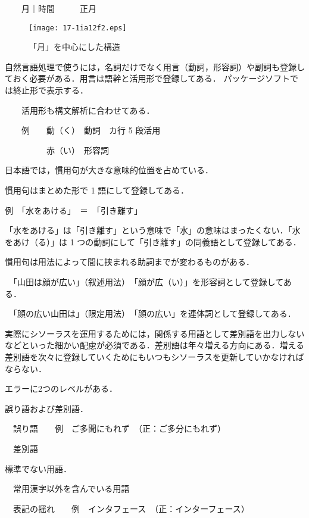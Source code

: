 \documentclass[japanese]{jnlp_1.4}
\begin{document}
　　月｜時間　　　正月

\begin{figure}[b]
 \begin{center}
  \texttt{[image: 17-1ia12f2.eps]}
 \end{center}
 \caption{「月」を中心にした構造}
 \label{fig:2}
\end{figure}


自然言語処理で使うには，名詞だけでなく用言（動詞，形容詞）や副詞も登録しておく必要がある．用言は語幹と活用形で登録してある．
パッケージソフトでは終止形で表示する．
\pagebreak


　　活用形も構文解析に合わせてある． 

　　例　　動（く）　動詞　カ行 5 段活用

　　　　　赤（い）　形容詞


日本語では，慣用句が大きな意味的位置を占めている．

慣用句はまとめた形で 1 語にして登録してある．

例　「水をあける」　＝　「引き離す」

「水をあける」は「引き離す」という意味で「水」の意味はまったくない．「水をあけ（る）」は 1 つの動詞にして「引き離す」の同義語として登録してある．

慣用句は用法によって間に挟まれる助詞までが変わるものがある．

　「山田は顔が広い」（叙述用法）　「顔が広（い）」を形容詞として登録してある．

　「顔の広い山田は」（限定用法）　「顔の広い」を連体詞として登録してある．


実際にシソーラスを運用するためには，関係する用語として差別語を出力しないなどといった細かい配慮が必須である．差別語は年々増える方向にある．増える差別語を次々に登録していくためにもいつもシソーラスを更新していかなければならない．

エラーに2つのレベルがある．

誤り語および差別語．

　誤り語　　例　ご多聞にもれず　（正：ご多分にもれず）

　差別語

標準でない用語．

　常用漢字以外を含んでいる用語

　表記の揺れ　　例　インタフェース　（正：インターフェース）
\end{document}
